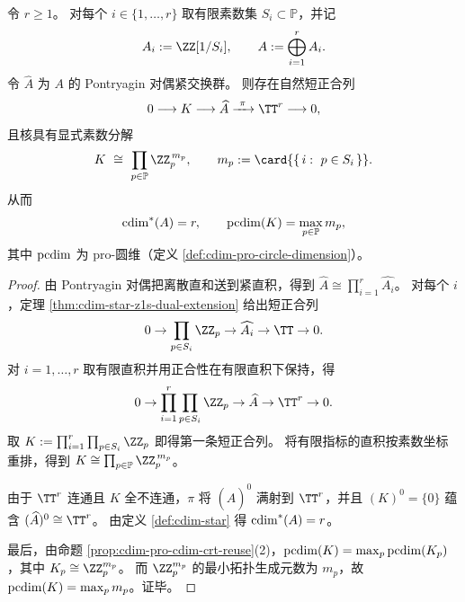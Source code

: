 \begin{theorem}[混合局部化的相位圆轴与素数纤维轴分解]\label{thm:cdim-star-mixed-localization-two-axis-decomposition}
令 \(r\ge 1\)。
对每个 \(i\in\{1,\dots,r\}\) 取有限素数集 \(S_i\subset\mathbb P\)，并记
\[
A_i:=\ZZ[1/S_i],
\qquad
A:=\bigoplus_{i=1}^{r}A_i.
\]
令 \(\widehat A\) 为 \(A\) 的 Pontryagin 对偶紧交换群。
则存在自然短正合列
\[
0\longrightarrow K\longrightarrow \widehat A\xrightarrow{\ \pi\ }\TT^{r}\longrightarrow 0,
\]
且核具有显式素数分解
\[
K\ \cong\ \prod_{p\in\mathbb P}\ZZ_p^{\,m_p},
\qquad
m_p:=\card{\{\,i:\ p\in S_i\,\}}.
\]
从而
\[
\operatorname{cdim}^\ast(A)=r,
\qquad
\operatorname{pcdim}(K)=\max_{p\in\mathbb P}m_p,
\]
其中 \(\operatorname{pcdim}\) 为 pro-圆维（定义 \ref{def:cdim-pro-circle-dimension}）。
\end{theorem}
\begin{proof}
由 Pontryagin 对偶把离散直和送到紧直积，得到 \(\widehat A\cong \prod_{i=1}^{r}\widehat{A_i}\)。
对每个 \(i\)，定理 \ref{thm:cdim-star-z1s-dual-extension} 给出短正合列
\[
0\to \prod_{p\in S_i}\ZZ_p\to \widehat{A_i}\to \TT\to 0.
\]
对 \(i=1,\dots,r\) 取有限直积并用正合性在有限直积下保持，得
\[
0\to \prod_{i=1}^{r}\prod_{p\in S_i}\ZZ_p\to \widehat A\to \TT^{r}\to 0.
\]
取 \(K:=\prod_{i=1}^{r}\prod_{p\in S_i}\ZZ_p\) 即得第一条短正合列。
将有限指标的直积按素数坐标重排，得到
\(
K\cong\prod_{p\in\mathbb P}\ZZ_p^{\,m_p}
\)。
\par
由于 \(\TT^{r}\) 连通且 \(K\) 全不连通，\(\pi\) 将 \((\widehat A)^0\) 满射到 \(\TT^{r}\)，并且 \((K)^0=\{0\}\) 蕴含 \((\widehat A)^0\cong \TT^{r}\)。
由定义 \ref{def:cdim-star} 得 \(\operatorname{cdim}^\ast(A)=r\)。
\par
最后，由命题 \ref{prop:cdim-pro-cdim-crt-reuse}(2)，\(\operatorname{pcdim}(K)=\max_p\operatorname{pcdim}(K_p)\)，其中 \(K_p\cong \ZZ_p^{m_p}\)。
而 \(\ZZ_p^{m_p}\) 的最小拓扑生成元数为 \(m_p\)，故 \(\operatorname{pcdim}(K)=\max_p m_p\)。证毕。
\end{proof}

